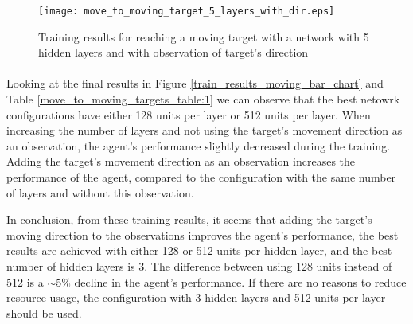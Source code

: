 \begin{figure}
    \begin{center}
        \texttt{[image: move\_to\_moving\_target\_5\_layers\_with\_dir.eps]}
        \caption{Training results for reaching a moving target with a network with 5 hidden layers and with observation of target's direction}
        \label{train_results_moving_5_layers_with_dir}
    \end{center}
\end{figure}


\paragraph{}
Looking at the final results in Figure \ref{train_results_moving_bar_chart} and Table \ref{move_to_moving_targets_table:1} we can observe that the best netowrk configurations have either 128 units per layer or 512 units per layer. When increasing the number of layers and not using the target's movement direction as an observation, the agent's performance slightly decreased during the training. Adding the target's movement direction as an observation increases the performance of the agent, compared to the configuration with the same number of layers and without this observation. 

In conclusion, from these training results, it seems that adding the target's moving direction to the observations improves the agent's performance, the best results are achieved with either 128 or 512 units per hidden layer, and the best number of hidden layers is 3. The difference between using 128 units instead of 512 is a $\sim5\%$ decline in the agent's performance. If there are no reasons to reduce resource usage, the configuration with 3 hidden layers and 512 units per layer should be used.

